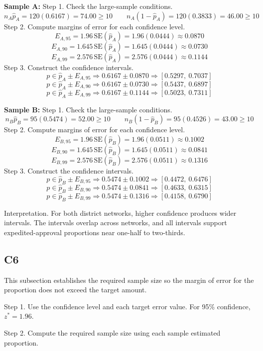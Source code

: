 \begin{ExamProblems}
		\textbf{Sample A:}
		Step 1.
		Check the large-sample conditions.
		\[
		n_A\hat{p}_A = 120(0.6167) = 74.00 \ge 10
		\qquad
		n_A(1-\hat{p}_A) = 120(0.3833) = 46.00 \ge 10
		\]
		Step 2.
		Compute margins of error for each confidence level.
		\[
		E_{A,95} = 1.96\,\mathrm{SE}(\hat{p}_A) = 1.96(0.0444) \approx 0.0870
		\]
		\[
		E_{A,90} = 1.645\,\mathrm{SE}(\hat{p}_A) = 1.645(0.0444) \approx 0.0730
		\]
		\[
		E_{A,99} = 2.576\,\mathrm{SE}(\hat{p}_A) = 2.576(0.0444) \approx 0.1144
		\]
		Step 3.
		Construct the confidence intervals.
		\[
		p \in \hat{p}_A \pm E_{A,95}
		\Rightarrow 0.6167 \pm 0.0870
		\Rightarrow [0.5297,\ 0.7037]
		\]
		\[
		p \in \hat{p}_A \pm E_{A,90}
		\Rightarrow 0.6167 \pm 0.0730
		\Rightarrow [0.5437,\ 0.6897]
		\]
		\[
		p \in \hat{p}_A \pm E_{A,99}
		\Rightarrow 0.6167 \pm 0.1144
		\Rightarrow [0.5023,\ 0.7311]
		\]
		
		\textbf{Sample B:}
		Step 1.
		Check the large-sample conditions.
		\[
		n_B\hat{p}_B = 95(0.5474) = 52.00 \ge 10
		\qquad
		n_B(1-\hat{p}_B) = 95(0.4526) = 43.00 \ge 10
		\]
		Step 2.
		Compute margins of error for each confidence level.
		\[
		E_{B,95} = 1.96\,\mathrm{SE}(\hat{p}_B) = 1.96(0.0511) \approx 0.1002
		\]
		\[
		E_{B,90} = 1.645\,\mathrm{SE}(\hat{p}_B) = 1.645(0.0511) \approx 0.0841
		\]
		\[
		E_{B,99} = 2.576\,\mathrm{SE}(\hat{p}_B) = 2.576(0.0511) \approx 0.1316
		\]
		Step 3.
		Construct the confidence intervals.
		\[
		p \in \hat{p}_B \pm E_{B,95}
		\Rightarrow 0.5474 \pm 0.1002
		\Rightarrow [0.4472,\ 0.6476]
		\]
		\[
		p \in \hat{p}_B \pm E_{B,90}
		\Rightarrow 0.5474 \pm 0.0841
		\Rightarrow [0.4633,\ 0.6315]
		\]
		\[
		p \in \hat{p}_B \pm E_{B,99}
		\Rightarrow 0.5474 \pm 0.1316
		\Rightarrow [0.4158,\ 0.6790]
		\]
		
		Interpretation.
		For both district networks, higher confidence produces wider intervals.
		The intervals overlap across networks, and all intervals support expedited-approval proportions near one-half to two-thirds.
		
		\subsection*{C6}
		This subsection establishes the required sample size so the margin of error for the proportion does not exceed the target amount.
		
		Step 1.
		Use the confidence level and each target error value.
		For 95\% confidence, $z^* = 1.96$.
		
		Step 2.
		Compute the required sample size using each sample estimated proportion.
		

\end{ExamProblems}
